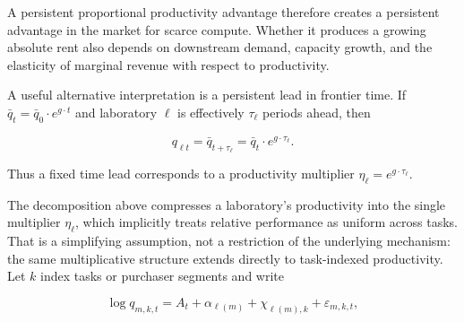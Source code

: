 \documentclass[11pt]{article}
\begin{document}
A persistent proportional productivity advantage therefore creates a persistent advantage in the market for scarce compute. Whether it produces a growing absolute rent also depends on downstream demand, capacity growth, and the elasticity of marginal revenue with respect to productivity.

A useful alternative interpretation is a persistent lead in frontier time. If $\bar q_t=\bar q_0\cdot e^{g\cdot t}$ and laboratory $\ell$ is effectively $\tau_\ell$ periods ahead, then

\begin{equation}q_{\ell t}=\bar q_{t+\tau_\ell}=\bar q_t\cdot e^{g\cdot\tau_\ell}.\end{equation}

Thus a fixed time lead corresponds to a productivity multiplier $\eta_\ell=e^{g\cdot\tau_\ell}$.

The decomposition above compresses a laboratory's productivity into the single multiplier $\eta_\ell$, which implicitly treats relative performance as uniform across tasks. That is a simplifying assumption, not a restriction of the underlying mechanism: the same multiplicative structure extends directly to task-indexed productivity. Let $k$ index tasks or purchaser segments and write

\begin{equation}\log q_{m,k,t}=A_t+\alpha_{\ell(m)}+\chi_{\ell(m),k}+\varepsilon_{m,k,t},\end{equation}
\end{document}
